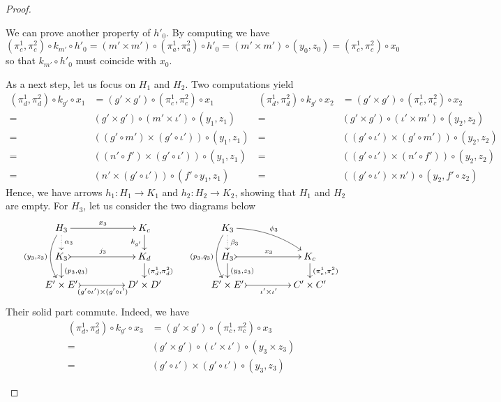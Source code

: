 \documentclass[3p]{elsarticle}
\theoremstyle{remark}
\theoremstyle{definition}
\begin{document}
\begin{proof}
\begin{enumerate}
We can prove another property of $h'_0$. By computing we have
\[(\pi^1_c, \pi^2_c)\circ k_{m'}\circ h'_0=(m'\times m')\circ (\pi^1_a, \pi^2_a)\circ h'_0=(m'\times m')\circ (y_0, z_0)=(\pi^1_c, \pi^2_c)\circ x_0\]
so that $k_{m'}\circ h'_0$ must coincide with $x_0$.

As a next step, let us focus on $H_1$ and $H_2$. Two computations yield \small
 \[\begin{split}
(\pi^1_d, \pi^2_d)\circ k_{g'}\circ x_1&=(g'\times g')\circ (\pi^1_c, \pi^2_c)\circ x_1\\=&(g'\times g')\circ (m'\times \iota')\circ (y_1, z_1)\\=&((g'\circ m') \times (g'\circ \iota'))\circ (y_1, z_1)\\=&((n'\circ f') \times (g'\circ \iota'))\circ (y_1, z_1)\\=&(n'\times  (g'\circ \iota'))\circ (f'\circ y_1, z_1)
 \end{split} \hspace{1pt} \begin{split}
 (\pi^1_d, \pi^2_d)\circ k_{g'}\circ x_2&=(g'\times g')\circ (\pi^1_c, \pi^2_c)\circ x_2\\=&(g'\times g')\circ ( \iota' \times m')\circ (y_2, z_2)\\=&((g'\circ \iota') \times (g'\circ m'))\circ (y_2, z_2)\\=&( (g'\circ \iota') \times (n'\circ f'))\circ (y_2, z_2)\\=&((g'\circ \iota') \times n')\circ (y_2, f'\circ z_2)
 \end{split} \]
\normalsize
 Hence, we have arrows $h_1\colon H_1\to K_1$ and $h_2\colon H_2\to K_2$, showing that $H_1$ and $H_2$ are empty. For $H_3$, let us consider the two diagrams below
 \[ \xymatrix@C=45pt@R=15pt{ H_3 \ar@{.>}[d]^{\alpha_3} \ar[r]^{x_3} \ar@/_.4cm/[dd]_{(y_3, z_3)} & K_c \ar[d]_{k_{g'}}& K_3 \ar@{.>}[d]^{\beta_3} \ar@/^.3cm$ $/[dr]^{\phi_3} \ar@/_.4cm/[dd]_{(p_3, q_3)}\\K_3 \ar@{>->}[r]^{j_3}  \ar[d]^{(p_3, q_3)} & K_d \ar[d]^{(\pi^1_d, \pi^2_d)} &  H_3 \ar@{>->}[r]^{x_3}  \ar[d]^{(y_3, z_3)} & K_c \ar[d]^{(\pi^1_c, \pi^2_c)}  \\
   E'\times E' \ar@{>->}[r]_-{(g'\circ \iota')\times (g'\circ \iota')} & D'\times D' & E'\times E' \ar@{>->}[r]_-{ \iota'\times  \iota'} & C'\times C'}\]
 Their solid part commute. Indeed, we have
 \[\begin{split}
 	(\pi^1_d, \pi^2_d)\circ k_{g'}\circ x_3&=(g'\times g')\circ (\pi^1_c, \pi^2_c) \circ x_3\\=&(g'\times g')\circ (\iota'\times \iota')\circ (y_3\times z_3)\\=&(g'\circ \iota') \times (g'\circ \iota')\circ (y_3, z_3)

\end{split}\]
\end{enumerate}
\end{proof}
\end{document}
